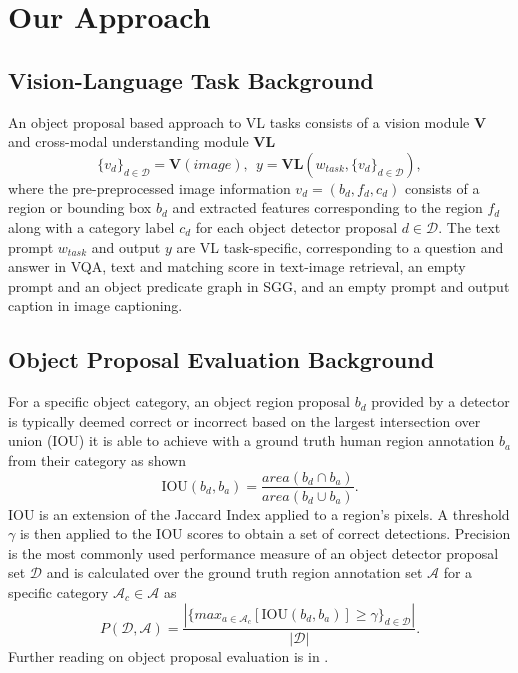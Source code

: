 \documentclass[10pt,twocolumn,letterpaper]{article}
\begin{document}
\section{Our Approach}
\subsection{Vision-Language Task Background}
An object proposal based approach to VL tasks consists of a vision module \textbf{V} and cross-modal understanding module \textbf{VL}
\begin{equation}
\{v_d\}_{d \in \mathcal{D}}\!=\!\textbf{V}(image), \ \ y\!=\!\textbf{VL}(w_{task},\{v_d\}_{d \in \mathcal{D}}),
\end{equation}
where the pre-preprocessed image information $v_d=(b_d,f_d,c_d)$ consists of a region or bounding box $b_d$ and extracted features corresponding to the region $f_d$ along with a category label $c_d$ for each object detector proposal $d \! \in \! \mathcal{D}$. The text prompt $w_{task}$ and output $y$ are VL task-specific, corresponding to a question and answer in VQA, text and matching score in text-image retrieval, an empty prompt and an object predicate graph in SGG, and an empty prompt and output caption in image captioning. 
\subsection{Object Proposal Evaluation Background}
For a specific object category, an object region proposal $b_d$ provided by a detector is typically deemed correct or incorrect based on the largest intersection over union (IOU) it is able to achieve with a ground truth human region annotation $b_{a}$ from their category as shown
\begin{equation}
\text{IOU}(b_d,b_a) = \frac{area(b_d \cap b_{a})}{area(b_d \cup b_a)}.
\end{equation}
IOU is an extension of the Jaccard Index applied to a region's pixels. A threshold $\gamma$ is then applied to the IOU scores to obtain a set of correct detections. Precision is the most commonly used performance measure of an object detector proposal set $\mathcal{D}$ and is calculated over the ground truth region annotation set $\mathcal{A}$ for a specific category $\mathcal{A}_c \! \in \! \mathcal{A}$ as
\begin{equation}
P(\mathcal{D},\mathcal{A})=\frac{|\{max_{a \in \mathcal{A}_c}[\text{IOU}(b_d,b_a)] \geq \gamma\}_{d \in \mathcal{D}}|}{|\mathcal{D}|}.
\end{equation}
Further reading on object proposal evaluation is in \cite{evalsurvey2020}.
\end{document}
